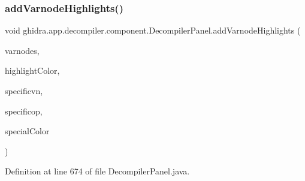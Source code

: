 \subsubsection{\texorpdfstring{addVarnodeHighlights()}{addVarnodeHighlights()}}
{\footnotesize\ttfamily void ghidra.\+app.\+decompiler.\+component.\+Decompiler\+Panel.\+add\+Varnode\+Highlights (\begin{DoxyParamCaption}\item[{Set$<$ \mbox{\hyperlink{class_varnode}{Varnode}} $>$}]{varnodes,  }\item[{Color}]{highlight\+Color,  }\item[{\mbox{\hyperlink{class_varnode}{Varnode}}}]{specificvn,  }\item[{\mbox{\hyperlink{class_pcode_op}{Pcode\+Op}}}]{specificop,  }\item[{Color}]{special\+Color }\end{DoxyParamCaption})\hspace{0.3cm}{\ttfamily [inline]}}



Definition at line 674 of file Decompiler\+Panel.\+java.

